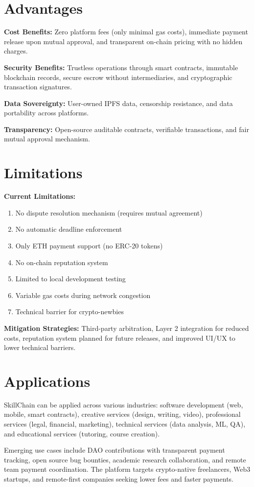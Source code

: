 \section{Advantages}

\textbf{Cost Benefits:} Zero platform fees (only minimal gas costs), immediate payment release upon mutual approval, and transparent on-chain pricing with no hidden charges.

\textbf{Security Benefits:} Trustless operations through smart contracts, immutable blockchain records, secure escrow without intermediaries, and cryptographic transaction signatures.

\textbf{Data Sovereignty:} User-owned IPFS data, censorship resistance, and data portability across platforms.

\textbf{Transparency:} Open-source auditable contracts, verifiable transactions, and fair mutual approval mechanism.

\section{Limitations}

\textbf{Current Limitations:}
\begin{enumerate}
    \item No dispute resolution mechanism (requires mutual agreement)
    \item No automatic deadline enforcement
    \item Only ETH payment support (no ERC-20 tokens)
    \item No on-chain reputation system
    \item Limited to local development testing
    \item Variable gas costs during network congestion
    \item Technical barrier for crypto-newbies
\end{enumerate}

\textbf{Mitigation Strategies:} Third-party arbitration, Layer 2 integration for reduced costs, reputation system planned for future releases, and improved UI/UX to lower technical barriers.

\section{Applications}

SkillChain can be applied across various industries: software development (web, mobile, smart contracts), creative services (design, writing, video), professional services (legal, financial, marketing), technical services (data analysis, ML, QA), and educational services (tutoring, course creation).

Emerging use cases include DAO contributions with transparent payment tracking, open source bug bounties, academic research collaboration, and remote team payment coordination. The platform targets crypto-native freelancers, Web3 startups, and remote-first companies seeking lower fees and faster payments.